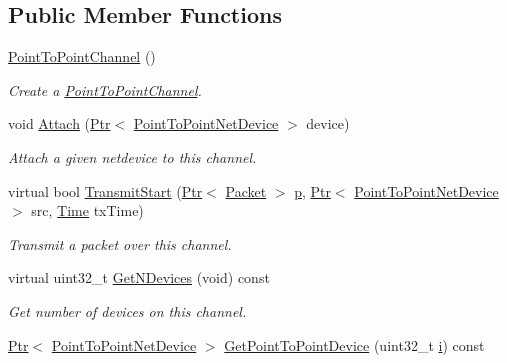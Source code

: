 \subsection*{Public Member Functions}
\begin{DoxyCompactItemize}
\item 
\hyperlink{classns3_1_1PointToPointChannel_a81318c3ab2fdd02f5663fb0e8fcdeabf}{Point\+To\+Point\+Channel} ()
\begin{DoxyCompactList}\small\item\em Create a \hyperlink{classns3_1_1PointToPointChannel}{Point\+To\+Point\+Channel}. \end{DoxyCompactList}\item 
void \hyperlink{classns3_1_1PointToPointChannel_a5238f81b5b44d1278e4f016c883f6482}{Attach} (\hyperlink{classns3_1_1Ptr}{Ptr}$<$ \hyperlink{classns3_1_1PointToPointNetDevice}{Point\+To\+Point\+Net\+Device} $>$ device)
\begin{DoxyCompactList}\small\item\em Attach a given netdevice to this channel. \end{DoxyCompactList}\item 
virtual bool \hyperlink{classns3_1_1PointToPointChannel_ad3032b1fa7e3e046ccd0bc7e1b5de80b}{Transmit\+Start} (\hyperlink{classns3_1_1Ptr}{Ptr}$<$ \hyperlink{classns3_1_1Packet}{Packet} $>$ \hyperlink{lte__link__budget__x2__handover__measures_8m_ac9de518908a968428863f829398a4e62}{p}, \hyperlink{classns3_1_1Ptr}{Ptr}$<$ \hyperlink{classns3_1_1PointToPointNetDevice}{Point\+To\+Point\+Net\+Device} $>$ src, \hyperlink{classns3_1_1Time}{Time} tx\+Time)
\begin{DoxyCompactList}\small\item\em Transmit a packet over this channel. \end{DoxyCompactList}\item 
virtual uint32\+\_\+t \hyperlink{classns3_1_1PointToPointChannel_aced5abec9268f6a4f2fdc346cab353cd}{Get\+N\+Devices} (void) const 
\begin{DoxyCompactList}\small\item\em Get number of devices on this channel. \end{DoxyCompactList}\item 
\hyperlink{classns3_1_1Ptr}{Ptr}$<$ \hyperlink{classns3_1_1PointToPointNetDevice}{Point\+To\+Point\+Net\+Device} $>$ \hyperlink{classns3_1_1PointToPointChannel_ad6c057d290efc8670c2ea974317e6489}{Get\+Point\+To\+Point\+Device} (uint32\+\_\+t \hyperlink{lte__uplink__power__control_8m_a6f6ccfcf58b31cb6412107d9d5281426}{i}) const 

\end{DoxyCompactItemize}
